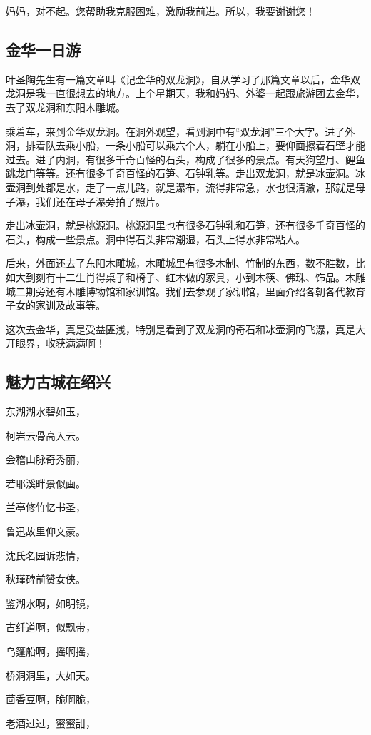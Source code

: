 \documentclass[UTF8,a4paper,titlepage,twoside,10.5pt]{article}
\begin{document}
妈妈，对不起。您帮助我克服困难，激励我前进。所以，我要谢谢您！

\subsection{金华一日游}
\label{sec:org9fdb158}

叶圣陶先生有一篇文章叫《记金华的双龙洞》，自从学习了那篇文章以后，金华双龙洞是我一直很想去的地方。上个星期天，我和妈妈、外婆一起跟旅游团去金华，去了双龙洞和东阳木雕城。

乘着车，来到金华双龙洞。在洞外观望，看到洞中有“双龙洞”三个大字。进了外洞，排着队去乘小船，一条小船可以乘六个人，躺在小船上，要仰面擦着石壁才能过去。进了内洞，有很多千奇百怪的石头，构成了很多的景点。有天狗望月、鲤鱼跳龙门等等。还有很多千奇百怪的石笋、石钟乳等。走出双龙洞，就是冰壶洞。冰壶洞到处都是水，走了一点儿路，就是瀑布，流得非常急，水也很清澈，那就是母子瀑，我们还在母子瀑旁拍了照片。

走出冰壶洞，就是桃源洞。桃源洞里也有很多石钟乳和石笋，还有很多千奇百怪的石头，构成一些景点。洞中得石头非常潮湿，石头上得水非常粘人。

后来，外面还去了东阳木雕城，木雕城里有很多木制、竹制的东西，数不胜数，比如大到刻有十二生肖得桌子和椅子、红木做的家具，小到木筷、佛珠、饰品。木雕城二期旁还有木雕博物馆和家训馆。我们去参观了家训馆，里面介绍各朝各代教育子女的家训及故事等。

这次去金华，真是受益匪浅，特别是看到了双龙洞的奇石和冰壶洞的飞瀑，真是大开眼界，收获满满啊！

\subsection{魅力古城在绍兴}
\label{sec:orgab1bf62}

东湖湖水碧如玉，

柯岩云骨高入云。

会稽山脉奇秀丽，

若耶溪畔景似画。

兰亭修竹忆书圣，

鲁迅故里仰文豪。

沈氏名园诉悲情，

秋瑾碑前赞女侠。

鉴湖水啊，如明镜，

古纤道啊，似飘带，

乌篷船啊，摇啊摇，

桥洞洞里，大如天。

茴香豆啊，脆啊脆，

老酒过过，蜜蜜甜，
\end{document}
